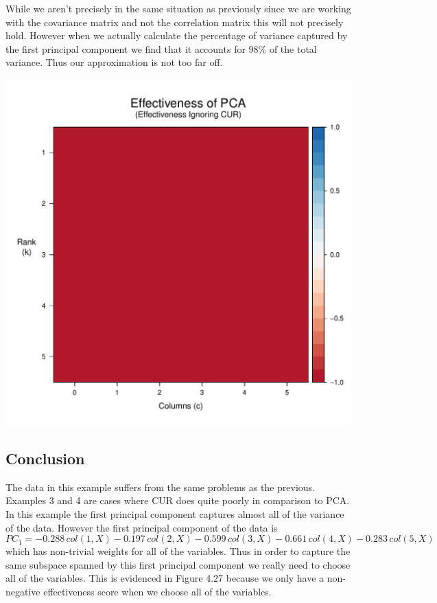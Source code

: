 \documentclass{book}
\begin{document}
While we aren't precisely in the same situation as previously since we are working with the covariance matrix and not the correlation matrix this will not precisely hold. However when we actually calculate the percentage of variance captured by the first principal component we find that it accounts for $98\%$ of the total variance. Thus
 our approximation is not too far off. 
\newpage
\begin{center}
\includegraphics[scale=.63]{./Figures/crabs/pca_raster.pdf}
\end{center}

\subsection{Conclusion}

The data in this example suffers from the same problems as the previous. Examples 3 and 4 are cases where CUR does quite poorly in comparison to PCA. In this example the first principal component captures almost all of the variance of the data. However the first principal component of the data is
$$
PC_1=-0.288\,col(1,X)-0.197\,col(2,X)-0.599\,col(3,X)-0.661\,col(4,X)-0.283\,col(5,X)
$$
which has non-trivial weights for all of the variables. Thus in order to capture the same subspace spanned by this first principal component we really need to choose all of the variables. This is evidenced in Figure 4.27 because we only have a non-negative effectiveness score when we choose all of the variables. 
\end{document}
